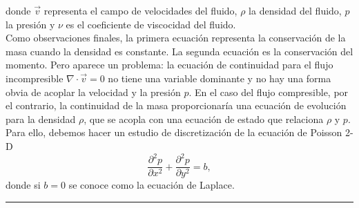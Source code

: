 \documentclass[A4,10pt]{article}
\begin{document}
\begin{multicols}{2}
donde $\vec{v}$ representa el campo de velocidades del fluido, $\rho$ la densidad del fluido, $p$ la presión y $\nu$ es el coeficiente de viscocidad del fluido.\\

 Como observaciones finales, la primera ecuación representa la conservación de la masa cuando la densidad es constante. La segunda ecuación es la conservación del momento. Pero aparece un problema: la ecuación de continuidad para el flujo incompresible $ \nabla \cdot \vec{v} = 0 $ no tiene una variable dominante y no hay una forma obvia de acoplar la velocidad  y la presión $ p $. En el caso del flujo compresible, por el contrario, la continuidad de la masa proporcionaría una ecuación de evolución para la densidad $ \rho $, que se acopla con una ecuación de estado que relaciona $ \rho $ y $ p $. Para ello, debemos hacer un estudio de discretización de la ecuación de Poisson 2-D
$$\frac{\partial ^2 p}{\partial x^2} + \frac{\partial ^2 p}{\partial y^2} = b,$$
donde si $b=0$ se conoce como la ecuación de Laplace.


\end{multicols}
\begin{center}\rule{0.9\textwidth}{0.1mm}
\end{center}
\end{document}

